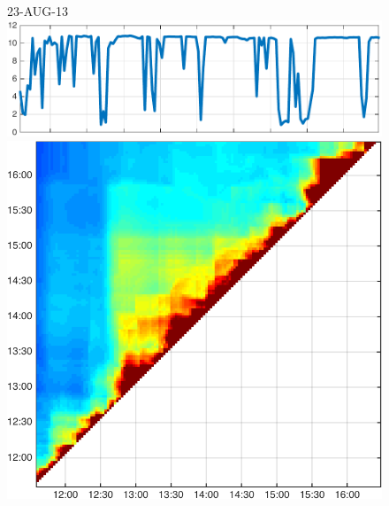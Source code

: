 \begin{figure}
\begin{minipage}[c]{\mylength}
\end{minipage}
\begin{minipage}[c]{\mylength}
\centering \scriptsize 23-AUG-13 \\
\includegraphics[valign=t,trim=0 0 5pt 0,angle=90,origin=tr,width=\sunintwidth,totalheight=\eventheight]{events/20130823-intensity.pdf}
\includegraphics[valign=t,width=\eventswidth]{events/20130823-maxGain-local-events.png}

\end{minipage}
\end{figure}
